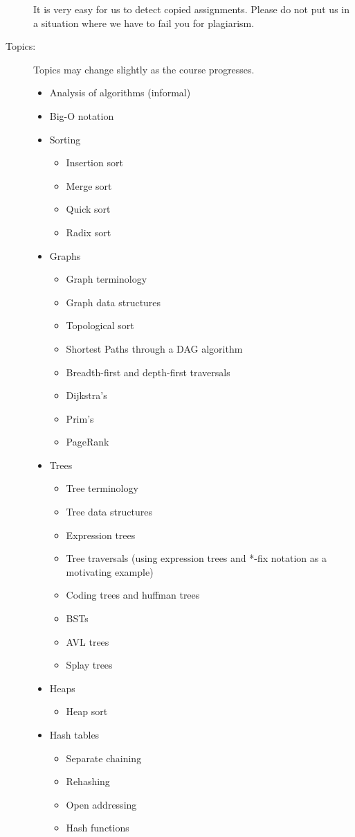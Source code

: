 \documentclass{article}
\begin{document}
\begin{description}
  It is very easy for us to detect copied assignments.  Please do not
  put us in a situation where we have to fail you for plagiarism.

\item[Topics:] Topics may change slightly as the course progresses.
\begin{itemize}  
\item Analysis of algorithms (informal)
\item Big-O notation
\item Sorting
  \begin{itemize}
  \item Insertion sort
\item Merge sort
\item Quick sort
\item Radix sort
  \end{itemize}
\item Graphs
  \begin{itemize}
\item Graph terminology
\item Graph data structures
\item Topological sort
\item Shortest Paths through a DAG algorithm
\item Breadth-first and depth-first traversals
\item Dijkstra's 
\item Prim's
\item PageRank
  \end{itemize}
\item Trees
  \begin{itemize}
\item Tree terminology
\item Tree data structures
\item Expression trees
\item Tree traversals (using expression trees and *-fix notation as a motivating example)
\item Coding trees and huffman trees
\item BSTs
\item AVL trees
\item Splay trees
\end{itemize}
\item Heaps
\begin{itemize}
\item Heap sort
\end{itemize}
\item Hash tables
\begin{itemize}
    \item Separate chaining
    \item Rehashing
    \item Open addressing
    \item Hash functions
\end{itemize}
\end{itemize}
\end{description}
\end{document}
